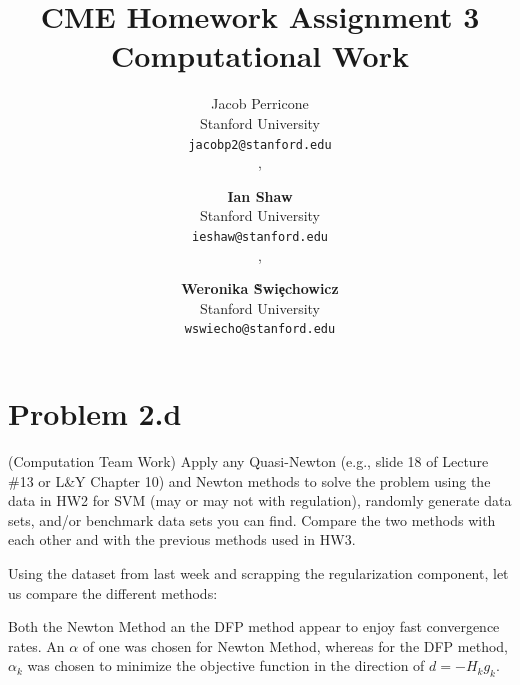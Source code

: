 \documentclass[answers]{exam}
\title{CME Homework Assignment 3 Computational Work}
\author{
Jacob Perricone \\
Stanford University\\
\texttt{jacobp2@stanford.edu} \\, \and
\textbf{Ian Shaw}\\
Stanford University\\
\texttt{ieshaw@stanford.edu} \\, \and
\textbf{Weronika \`Swi\c echowicz} \\ 
Stanford University\\
\texttt{wswiecho@stanford.edu}
}
\begin{document}
\maketitle

    
\section*{Problem 2.d } (Computation Team Work) Apply any Quasi-Newton (e.g., slide 18 of Lecture \#13 or L\&Y Chapter 10) and Newton methods to solve the problem using the data in HW2 for SVM (may or may not with regulation), randomly generate data sets, and/or benchmark data sets you can find. Compare the two methods with each other and with the previous methods used in HW3.


\newpage
\begin{framed}


Using the dataset from last week and scrapping the regularization component, let us compare the different methods:


Both the Newton Method an the DFP method appear to enjoy fast convergence rates. An $\alpha$ of one was chosen for Newton Method, whereas for the DFP method, $\alpha_k$ was chosen to minimize the objective function in the direction of $d = - H_k g_k$. 
    

\end{framed}
\end{document}
